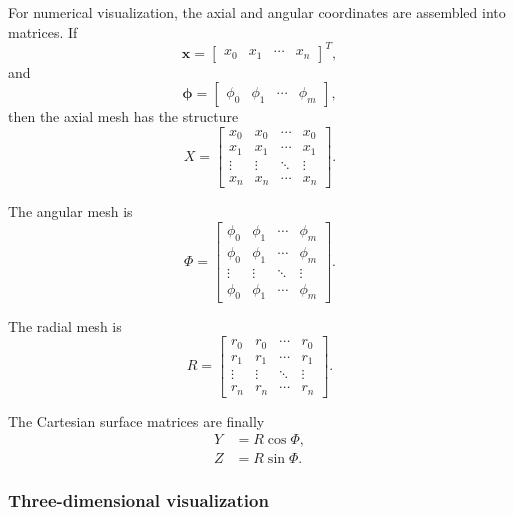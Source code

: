 \documentclass[journal,article,submit,oneauthor]{Definitions/mdpi}
\begin{document}
For numerical visualization, the axial and angular coordinates are assembled into matrices. If
\begin{equation}
\bm{x}=\begin{bmatrix}x_0&x_1&\cdots&x_n\end{bmatrix}^T,
\end{equation}
and
\begin{equation}
\bm{\phi}=\begin{bmatrix}\phi_0&\phi_1&\cdots&\phi_m\end{bmatrix},
\end{equation}
then the axial mesh has the structure
\begin{equation}
X=\begin{bmatrix}
x_0&x_0&\cdots&x_0\\
x_1&x_1&\cdots&x_1\\
\vdots&\vdots&\ddots&\vdots\\
x_n&x_n&\cdots&x_n
\end{bmatrix}.
\label{eq:Xmesh}
\end{equation}

The angular mesh is
\begin{equation}
\Phi=\begin{bmatrix}
\phi_0&\phi_1&\cdots&\phi_m\\
\phi_0&\phi_1&\cdots&\phi_m\\
\vdots&\vdots&\ddots&\vdots\\
\phi_0&\phi_1&\cdots&\phi_m
\end{bmatrix}.
\label{eq:Phimesh}
\end{equation}

The radial mesh is
\begin{equation}
R=\begin{bmatrix}
r_0&r_0&\cdots&r_0\\
r_1&r_1&\cdots&r_1\\
\vdots&\vdots&\ddots&\vdots\\
r_n&r_n&\cdots&r_n
\end{bmatrix}.
\label{eq:Rmesh}
\end{equation}

The Cartesian surface matrices are finally
\begin{align}
Y &= R\cos\Phi,\\
Z &= R\sin\Phi.
\end{align}

\subsubsection{Three-dimensional visualization}
\end{document}
